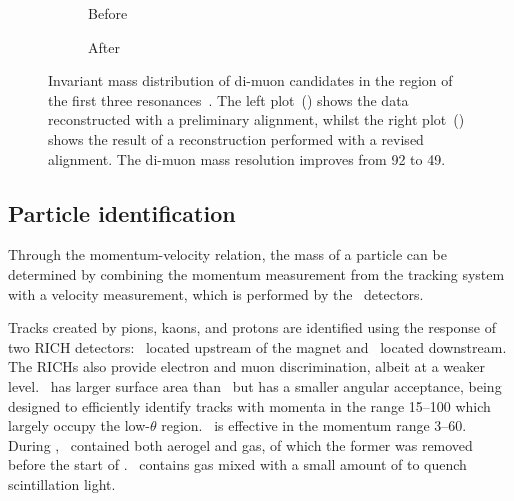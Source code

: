 \begin{figure}
  \begin{subfigure}{0.5\textwidth}
    \centering
    
    \caption{Before}
    \label{fig:intro:lhcb:alignment:pre}
  \end{subfigure}
  \begin{subfigure}{0.5\textwidth}
    \centering
    
    \caption{After}
    \label{fig:intro:lhcb:alignment:post}
  \end{subfigure}
  \caption{%
    Invariant mass distribution of di-muon candidates in the region of the 
    first three \PUpsilon resonances~\cite{Dujany:082010}.
    The left plot~() shows the data 
    reconstructed with a preliminary alignment, whilst the right 
    plot~() shows the result of a 
    reconstruction performed with a revised alignment.
    The di-muon mass resolution improves from \SI{92}{\MeVcc} to 
    \SI{49}{\MeVcc}.
  }
  \label{fig:intro:lhcb:alignment}
\end{figure}

\subsection{Particle identification}
\label{chap:intro:lhcb:detector:pid}

Through the momentum-velocity relation, the mass of a particle can be 
determined by combining the momentum measurement from the tracking system with 
a velocity measurement, which is performed by the \rich\ detectors.

Tracks created by pions, kaons, and protons are identified using the response 
of two \acl{RICH} detectors: \richone\ located upstream of the magnet and 
\richtwo\ located downstream.
The \acp{RICH} also provide electron and muon discrimination, albeit at a 
weaker level.
\richtwo\ has larger surface area than \richone\ but has a smaller angular 
acceptance, being designed to efficiently identify tracks with momenta in the 
range \SIrange{15}{100}{\GeVc} which largely occupy the low-$\theta$ region.
\richone\ is effective in the momentum range \SIrange{3}{60}{\GeVc}.
During \runone, \richone\ contained both aerogel and  gas, of which 
the former was removed before the start of \runtwo.
\richtwo\ contains  gas mixed with a small amount of  to quench 
scintillation light.

